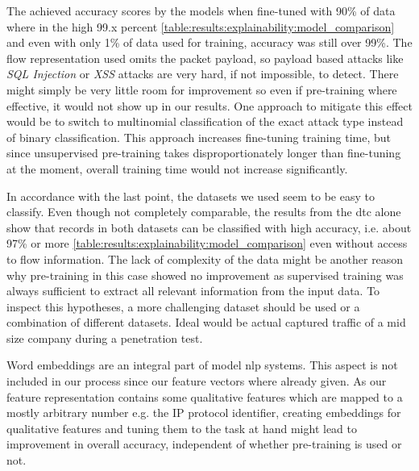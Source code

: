 The achieved accuracy scores by the models when fine-tuned with 90\% of data where in the high 99.x percent \ref{table:results:explainability:model_comparison} and even with only 1\% of data used for training, accuracy was still over 99\%. The flow representation used omits the packet payload, so payload based attacks like \textit{SQL Injection} or \textit{XSS} attacks are very hard, if not impossible, to detect. There might simply be very little room for improvement so even if pre-training where effective, it would not show up in our results. One approach to mitigate this effect would be to switch to multinomial classification of the exact attack type instead of binary classification. This approach increases fine-tuning training time, but since 
unsupervised pre-training takes disproportionately longer than fine-tuning at the moment, overall training time would not increase significantly. \par

In accordance with the last point, the datasets we used seem to be easy to classify. Even though not completely comparable, the results from the \gls{dtc} alone show that records in both datasets can be classified with high accuracy, i.e. about 97\% or more \ref{table:results:explainability:model_comparison} even without access to flow information.
The lack of complexity of the data might be another reason why pre-training in this case showed no improvement as supervised training was always sufficient to extract all relevant information from the input data. To inspect this hypotheses, a more challenging dataset should be used or a combination of different datasets. Ideal would be actual captured traffic of a mid size company during a penetration test. \par

Word embeddings are an integral part of model \gls{nlp} systems. This aspect is not included in our process since our feature vectors where already given. As our feature representation contains some qualitative features which are mapped to a mostly arbitrary number e.g. the IP protocol identifier, creating embeddings for qualitative features and tuning them to the task at hand might lead to improvement in overall accuracy, independent of whether pre-training is used or not. \par
	
